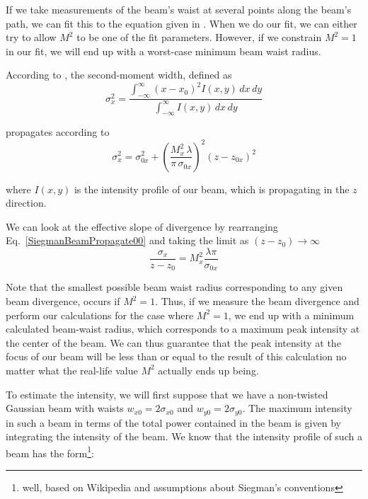 If we take measurements of the beam's waist at several points along the beam's path, we can fit this to the equation given in \cite{SiegmanBeamQuality}. When we do our fit, we can either try to allow $M^2$ to be one of the fit parameters. However, if we constrain $M^2=1$ in our fit, we will end up with a worst-case minimum beam waist radius. 

According to \cite{SiegmanBeamQuality}, the second-moment width, defined as 
\begin{equation}
\sigma_x^2=\frac{\int_{-\infty}^{\infty} (x-x_0)^2 I(x,y)\, dx\, dy}{\int_{-\infty}^{\infty} I(x,y)\, dx \, dy}
\end{equation} 

propagates according to 
\begin{equation}
\sigma_x^2=\sigma_{0x}^2+\left( \frac{M_x^2 \,\lambda}{\pi \, \sigma_{0x}}\right)^2 (z-z_{0x})^2 \label{SiegmanBeamPropagate00}
\end{equation}
 
where $I(x,y)$ is the intensity profile of our beam, which is propagating in the $z$ direction. 

We can look at the effective slope of divergence by rearranging Eq.\ \ref{SiegmanBeamPropagate00} and taking the limit as $(z-z_0) \rightarrow \infty$
\begin{equation}
\frac{\sigma_x}{z-z_0}=M_x^2 \frac{\lambda \pi}{\sigma_{0x}} \label{SiegmanBeamSlope}
\end{equation}

Note that the smallest possible beam waist radius corresponding to any given beam divergence, occurs if $M^2=1$. Thus, if we measure the beam divergence and perform our calculations for the case where $M^2=1$, we end up with a minimum calculated beam-waist radius, which corresponds to a maximum peak intensity at the center of the beam. We can thus guarantee that the peak intensity at the focus of our beam will be less than or equal to the result of this calculation no matter what the real-life value $M^2$ actually ends up being. 

To estimate the intensity, we will first suppose that we have a non-twisted Gaussian beam with waists $w_{x0}=2 \sigma_{x0}$ and $w_{y0}=2 \sigma_{y0}$. The maximum intensity in such a beam in terms of the total power contained in the beam is given by integrating the intensity of the beam. We know that the intensity profile of such a beam has the form\footnote{well, based on Wikipedia and assumptions about Siegman's conventions}:

